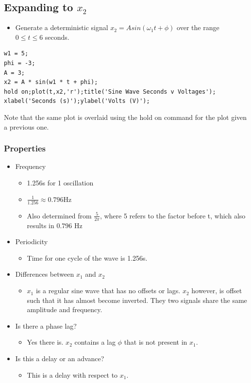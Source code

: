 \documentclass[12pt]{article}
\begin{document}
\subsection{Expanding to $x_2$}
\begin{itemize}
\item Generate a deterministic signal $x_2=Asin(\omega_{1}t + \phi)$ over the range $0 \leq t \leq 6$ seconds.
\end{itemize}

\begin{lstlisting}
w1 = 5;
phi = -3;
A = 3;
x2 = A * sin(w1 * t + phi);
hold on;plot(t,x2,'r');title('Sine Wave Seconds v Voltages');
xlabel('Seconds (s)');ylabel('Volts (V)');
\end{lstlisting}
Note that the same plot is overlaid using the hold on command for the plot given a previous one.

\subsubsection{Properties}
\begin{itemize}
\item Frequency
\begin{itemize}
\item 1.256s for 1 oscillation
\item $\frac{1}{1.256} \approx 0.796$Hz
\item Also determined from $\frac{5}{2\pi}$, where 5 refers to the factor before t, which also results in $0.796$ Hz
\end{itemize}
\item Periodicity
\begin{itemize}
\item Time for one cycle of the wave is 1.256s.
\end{itemize}
\item Differences between $x_1$ and $x_2$
\begin{itemize}
\item $x_1$ is a regular sine wave that has no offsets or lags. $x_2$ however, is offset such that it has almost become inverted. They two signals share the same amplitude and frequency.
\end{itemize}
\item Is there a phase lag?
\begin{itemize}
\item Yes there is. $x_2$ contains a lag $\phi$ that is not present in $x_1$.
\end{itemize}
\item Is this a delay or an advance?
\begin{itemize}
\item This is a delay with respect to $x_1$.
\end{itemize}
\end{itemize}
\end{document}
